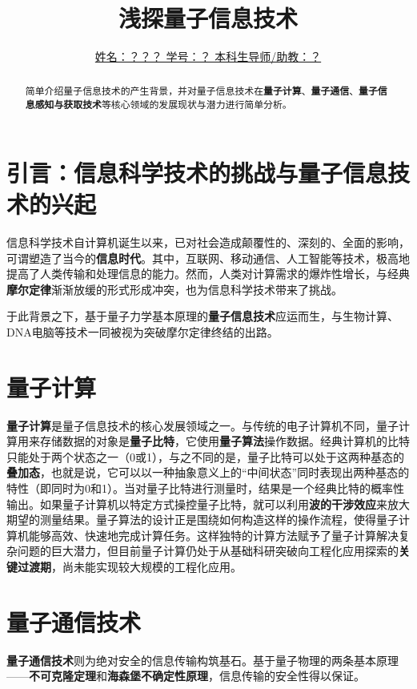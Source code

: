 \documentclass{article}
\title{\textbf{浅探量子信息技术}}
\author{\underline{姓名：？？？ \quad 学号：？  \quad 本科生导师/助教：？}}
\date{}
\begin{document}
\maketitle

\begin{abstract}
简单介绍量子信息技术的产生背景，并对量子信息技术在\textbf{量子计算}、\textbf{量子通信}、\textbf{量子信息感知与获取技术}等核心领域的发展现状与潜力进行简单分析。
\end{abstract}


\section{引言：信息科学技术的挑战与量子信息技术的兴起}

信息科学技术自计算机诞生以来，已对社会造成颠覆性的、深刻的、全面的影响，可谓塑造了当今的\textbf{信息时代}。其中，互联网、移动通信、人工智能等技术，极高地提高了人类传输和处理信息的能力。然而，人类对计算需求的爆炸性增长，与经典\textbf{摩尔定律}渐渐放缓的形式形成冲突，也为信息科学技术带来了挑战。

于此背景之下，基于量子力学基本原理的\textbf{量子信息技术}应运而生，与生物计算、DNA电脑等技术一同被视为突破摩尔定律终结的出路。\cite{tuomi2002lives} 

\section{量子计算}

\textbf{量子计算}是量子信息技术的核心发展领域之一。与传统的电子计算机不同，量子计算用来存储数据的对象是\textbf{量子比特}，它使用\textbf{量子算法}操作数据。经典计算机的比特只能处于两个状态之一（0或1），与之不同的是，量子比特可以处于这两种基态的\textbf{叠加态}，也就是说，它可以以一种抽象意义上的“中间状态”同时表现出两种基态的特性（即同时为0和1）。当对量子比特进行测量时，结果是一个经典比特的概率性输出。如果量子计算机以特定方式操控量子比特，就可以利用\textbf{波的干涉效应}来放大期望的测量结果。量子算法的设计正是围绕如何构造这样的操作流程，使得量子计算机能够高效、快速地完成计算任务。这样独特的计算方法赋予了量子计算解决复杂问题的巨大潜力，但目前量子计算仍处于从基础科研突破向工程化应用探索的\textbf{关键过渡期}，尚未能实现较大规模的工程化应用。

\section{量子通信技术}

\textbf{量子通信技术}则为绝对安全的信息传输构筑基石。基于量子物理的两条基本原理——\textbf{不可克隆定理}和\textbf{海森堡不确定性原理}，信息传输的安全性得以保证。
\end{document}
